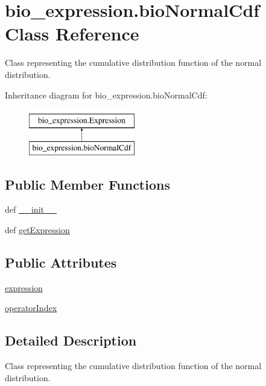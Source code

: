 \hypertarget{classbio__expression_1_1bio_normal_cdf}{\section{bio\+\_\+expression.\+bio\+Normal\+Cdf Class Reference}
\label{classbio__expression_1_1bio_normal_cdf}
}


Class representing the cumulative distribution function of the normal distribution.  


Inheritance diagram for bio\+\_\+expression.\+bio\+Normal\+Cdf\+:\begin{figure}[H]
\begin{center}
\leavevmode
\includegraphics[height=2.000000cm]{d2/d91/classbio__expression_1_1bio_normal_cdf}
\end{center}
\end{figure}
\subsection*{Public Member Functions}
\begin{DoxyCompactItemize}
\item 
def \hyperlink{classbio__expression_1_1bio_normal_cdf_ab521f885831101ee350b23870c9af612}{\+\_\+\+\_\+init\+\_\+\+\_\+}
\item 
def \hyperlink{classbio__expression_1_1bio_normal_cdf_a4ce3e60014197bfe569a9916fe1907d3}{get\+Expression}
\end{DoxyCompactItemize}
\subsection*{Public Attributes}
\begin{DoxyCompactItemize}
\item 
\hyperlink{classbio__expression_1_1bio_normal_cdf_a072f5a5a5a9d3d142c8314f89ea0a656}{expression}
\item 
\hyperlink{classbio__expression_1_1bio_normal_cdf_aa53261a1e8c2adb0080b545da7e74f0c}{operator\+Index}
\end{DoxyCompactItemize}


\subsection{Detailed Description}
Class representing the cumulative distribution function of the normal distribution. 

